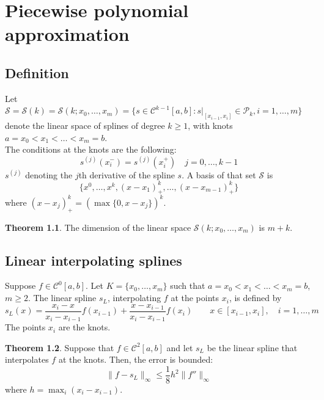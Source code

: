 \documentclass[12pt, openany]{report}
\theoremstyle{definition}
\newtheorem{thm}{Theorem}[chapter]
\begin{document}
\chapter{Piecewise polynomial approximation}
\section{Definition}
Let \(\mathcal{S}=\mathcal{S}(k)=\mathcal{S}(k;x_0,\dots,x_m)=\{s\in \mathcal{C}^{k-1}[a,b]:s|_{[x_{i-1},x_i]}\in \mathcal{P}_k,i=1,\dots,m\}\) denote the linear space of splines of degree \(k\ge 1\), with knots \(a=x_0<x_1<\dots <x_m=b\). \\
The conditions at the knots are the following:
\begin{equation}
    s^{(j)}(x_i^-) = s^{(j)}(x_i^+) \quad j=0,\dots, k-1
\end{equation}
\(s^{(j)}\) denoting the \(j\)th derivative of the spline \(s\).
A basis of that set \(\mathcal{S}\) is 
\begin{equation}
    \{x^0,\dots,x^k, (x-x_1)_+^k,\dots,(x-x_{m-1})^k_+\}
\end{equation}
where \((x-x_j)_+^k = (\max \{0,x-x_j\})^k\). \\
\begin{thm}
    The dimension of the linear space \(\mathcal{S}(k;x_0,\dots,x_m)\) is \(m+k\).
\end{thm}
\section{Linear interpolating splines}
Suppose $f\in \mathcal{C}^0[a,b]$. Let $K=\{x_0,\dots,x_m\}$ such that $a = x_0<x_1<\dots<x_m=b$, $m\ge2$. The linear spline $s_L$, interpolating $f$ at the points $x_i$, is defined by 
\begin{equation}
    s_L(x) = \frac{x_i-x}{x_i-x_{i-1}}f(x_{i-1}) + \frac{x-x_{i-1}}{x_i-x_{i-1}}f(x_i) \qquad x\in [x_{i-1},x_i], \quad i=1,\dots,m
\end{equation}
The points $x_i$ are the knots. 
\begin{thm}
    Suppose that $f\in \mathcal{C}^2[a,b]$ and let $s_L$ be the linear spline that interpolates $f$ at the knots. Then, the error is bounded:
    \begin{equation}
        \lVert f-s_L\rVert_{\infty} \le \frac{1}{8} h^2 \lVert f''\rVert_{\infty}
    \end{equation}
    where $h=\max_i (x_i-x_{i-1})$. 
\end{thm}
\end{document}
